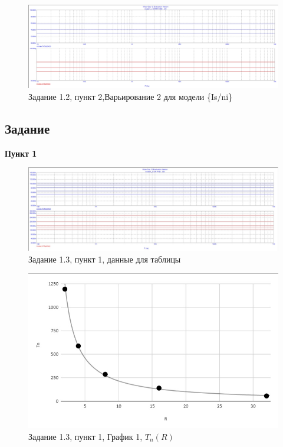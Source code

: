 \documentclass[a4paper, 14pt]{extarticle}%
\begin{document}
\begin{figure}[h!]
			\centering
			\includegraphics[width=1.1\linewidth]{1.2/pic7.jpg}
			\caption{Задание 1.2, пункт 2,Варьирование 2 для модели \{Is/ni\}}
			\label{A}
\end{figure}


\subsection{Задание}
\textbf{Пункт 1}
\begin{figure}[h!]
			\centering
			\includegraphics[width=1.1\linewidth]{1.3/pic8.jpg}
			\caption{Задание 1.3, пункт 1, данные для таблицы}
			\label{A}
\end{figure}

\begin{figure}[h!]
			\centering
			\includegraphics[width=1.1\linewidth]{1.3/pic9.jpg}
			\caption{Задание 1.3, пункт 1, График 1, $T_n(R)$}
			\label{A}
\end{figure}
\end{document}
